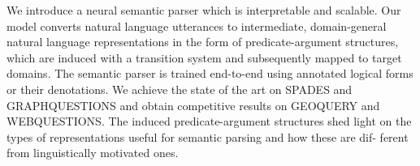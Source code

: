We introduce a neural semantic parser which is interpretable and scalable. Our model converts natural language utterances to intermediate, domain-general natural language representations in the form of predicate-argument structures, which are induced with a transition system and subsequently mapped to target domains. The semantic parser is trained end-to-end using annotated logical forms or their denotations. We achieve the state of the art on SPADES and GRAPHQUESTIONS and obtain competitive results on GEOQUERY and WEBQUESTIONS. The induced predicate-argument structures shed light on the types of representations useful for semantic parsing and how these are dif- ferent from linguistically motivated ones.
